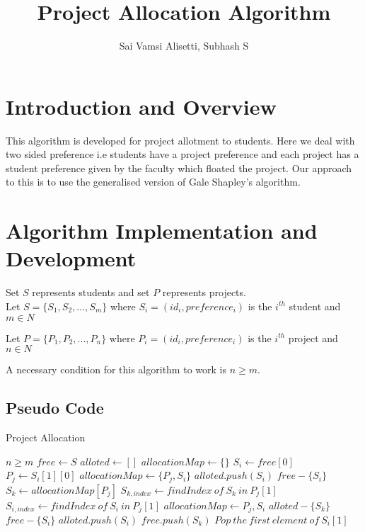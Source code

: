 \documentclass{article}
\title{Project Allocation Algorithm}
\author{Sai Vamsi Alisetti, Subhash S}
\date{}
\begin{document}
\maketitle

\section{Introduction and Overview}
This algorithm is developed for project allotment to students. Here we deal with two sided preference i.e students have a project preference and each project has a student preference given by the faculty which floated the project. Our approach to this is to use the generalised version of Gale Shapley's algorithm.
\section{Algorithm Implementation and Development}
Set $S$ represents students and set $P$ represents projects.\\

Let $S = \{ S_1, S_2, ... , S_m \}$ 
where 
$S_i = (id_i,preference_i)$ is the $i^{th}$ student
and 
$m \in N$ 

Let $P = \{P_1, P_2, ... , P_n\}$ 
where 
$P_i = (id_i,preference_i)$ is the $i^{th}$ project
and
$n \in N$

A necessary condition for this algorithm to work is $n \geq m$.

\subsection{Pseudo Code}
\begin{algorithm}[H]
\caption{Project Allocation}
\begin{algorithmic}
\REQUIRE $n \geq m $
\STATE $free \leftarrow S$
\STATE $alloted \leftarrow [  ]$ 
\STATE $allocationMap \leftarrow \{\}$
\STATE $S_i \leftarrow free[0]$
\STATE $P_j \leftarrow S_i[1][0]$
\STATE $allocationMap \leftarrow \{P_j,S_i\}$
\STATE $alloted.push(S_i)$
\STATE $free - \{S_i\}$
\ELSE 
\STATE $S_k \leftarrow allocationMap[P_j] $
\STATE $S_{k,index} \leftarrow  findIndex \: of \: S_k \: in \: P_j[1]$ 
\STATE $S_{i,index} \leftarrow findIndex \: of \: S_i \: in\: P_j[1]$
\STATE $allocationMap \leftarrow {P_j,S_i}$
\STATE $alloted - \{S_k\}$
\STATE $free - \{S_i\}$
\STATE $alloted.push(S_i)$
\STATE $free.push(S_k)$
\ELSE
\STATE $ Pop \: the \: first \: element \: of \: S_i[1]$
\ENDIF
\ENDIF
\ENDWHILE
\end{algorithmic}
\end{algorithm}
\end{document}
